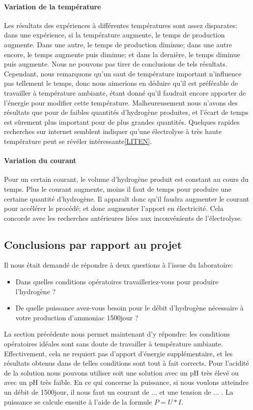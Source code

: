 \paragraph{Variation de la température} Les résultats des expériences à différentes températures sont assez disparates:
dans une expérience, si la température augmente, le temps de production augmente. Dans une autre, le temps de production
diminue; dans une autre encore, le temps augmente puis diminue; et dans la dernière, le temps diminue puis augmente.
Nous ne pouvons pas tirer de conclusions de tels résultats. Cependant, nous remarquons qu'un saut de température important
n'influence pas tellement le temps, donc nous aimerions en déduire qu'il est préférable de travailler à température
ambiante, étant donné qu'il faudrait encore apporter de l'énergie pour modifier cette température. Malheureusement 
nous n'avons des résultats que pour de faibles quantités d'hydrogène produites, et l'écart de temps est sûrement plus 
important pour de plus grandes quantités. Quelques rapides recherches sur internet semblent indiquer qu'une électrolyse
à très haute température peut se révéler intéressante\ref{LITEN}.

\paragraph{Variation du courant} Pour un certain courant, le volume d'hydrogène produit est constant au cours du temps.
Plus le courant augmente, moins il faut de temps pour produire une certaine quantité d'hydrogène. Il apparaît donc 
qu'il faudra augmenter le courant pour accélérer le procédé; et donc augmenter l'apport en électricité. Cela concorde 
avec les recherches antérieures liées aux inconvénients de l'électrolyse.

\subsection{Conclusions par rapport au projet}

Il nous était demandé de répondre à deux questions à l'issue du laboratoire:
\begin{itemize}
\item Dans quelles conditions opératoires travailleriez-vous pour produire l’hydrogène ?
\item De quelle puissance avez-vous besoin pour le débit d’hydrogène nécessaire à votre production d’ammoniac \unit{1500}{\tonne \per jour} ? 
\end{itemize}
La section précédente nous permet maintenant d'y répondre: les conditions opératoires idéales sont sans doute
de travailler à température ambiante. Effectivement, cela ne requiert pas d'apport d'énergie supplémentaire, et 
les résultats obtenus dans de telles conditions sont tout à fait corrects. Pour l'acidité de la solution nous pouvons
utiliser soit une solution avec un pH très élevé ou avec un pH très faible. En ce qui concerne la puissance, si nous 
voulons atteindre un débit de \unit{1500}{\tonne \per jour}, il nous faut un courant de ... et une tension de ... . La puissance se calcule ensuite à l'aide de la formule $P = U*I$.
